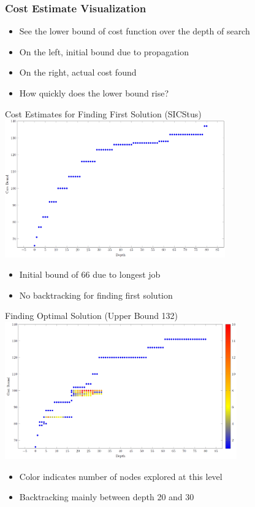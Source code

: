 \documentclass[dvipsnames,aspectratio=169]{beamer}
\begin{document}
\begin{frame}
  \frametitle{Cost Estimate Visualization}
  \begin{itemize}
      \item See the lower bound of cost function over the depth of search 
      \item On the left, initial bound due to propagation
      \item On the right, actual cost found
      \item How quickly does the lower bound rise?
  \end{itemize}
\end{frame}

\begin{frame}{Cost Estimates for Finding First Solution (SICStus)}
\includegraphics[width=9.5cm]{images/flowdepthcountrun1.PNG} 
\begin{itemize}
    \item Initial bound of 66 due to longest job  
    \item No backtracking for finding first solution
\end{itemize}
\end{frame}

\begin{frame}{Finding Optimal Solution (Upper Bound 132)}
\includegraphics[width=10cm]{images/flowdepthcountrun29.PNG}    
\begin{itemize}
    \item Color indicates number of nodes explored at this level
    \item Backtracking mainly between depth 20 and 30 
\end{itemize}
\end{frame}
\end{document}
